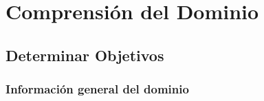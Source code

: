 \documentclass[11pt,a4paper]{tesis}
\begin{document}

\def\autor{Ing. Sebastian Ezequiel Jaremczuk}
\def\tituloTesis{Análisis de la Deserción en\\
	\vspace{.2cm} Carreras de Ingeniería}

\def\runtitulo{Deserción en Carreras de Ingeniería: Análisis de posibles causas}

\def\director{Mg. Ing. Juan Carlos Gómez}
\def\codirector{Dr. Marcelo Soria}
\def\lugar{Buenos Aires, 2020}


\frontmatter
\pagestyle{empty}



\cleardoublepage


\cleardoublepage
\tableofcontents

\mainmatter
\pagestyle{headings}


%
%
%


\chapter{Comprensión del Dominio}
\section{Determinar Objetivos}
\subsection{Información general del dominio}

\end{document}
